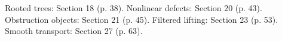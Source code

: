 {\small Rooted trees: Section 18 (p. 38). Nonlinear defects: Section 20 (p. 43). Obstruction objects: Section 21 (p. 45). Filtered lifting: Section 23 (p. 53). Smooth transport: Section 27 (p. 63).\par}

